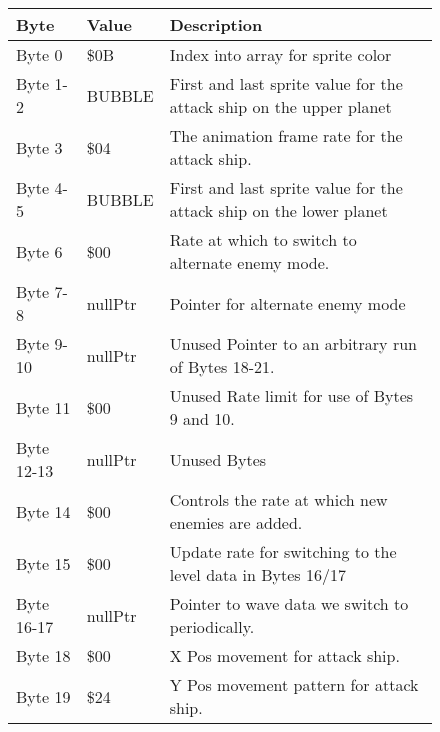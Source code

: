 \begin{figure}[H]
  {
  \setlength{\tabcolsep}{3.0pt}
  \setlength\cmidrulewidth{\heavyrulewidth} %
  \begin{adjustbox}{width=12cm}

\begin{tabular}{lll}
\toprule
 Byte       & Value                      & Description                                                         \\
\midrule
 Byte 0     & \$0B                        & Index into array for sprite color                                   \\
 Byte 1-2   & BUBBLE                     & First and last sprite value for the attack ship on the upper planet \\
 Byte 3     & \$04                        & The animation frame rate for the attack ship.                       \\
 Byte 4-5   & BUBBLE                     & First and last sprite value for the attack ship on the lower planet \\
 Byte 6     & \$00                        & Rate at which to switch to alternate enemy mode.                    \\
 Byte 7-8   & nullPtr                    & Pointer for alternate enemy mode                                    \\
 Byte 9-10  & nullPtr                    & Unused Pointer to an arbitrary run of Bytes 18-21.                  \\
 Byte 11    & \$00                        & Unused Rate limit for use of Bytes 9 and 10.                        \\
 Byte 12-13 & nullPtr                    & Unused Bytes                                                        \\
 Byte 14    & \$00                        & Controls the rate at which new enemies are added.                   \\
 Byte 15    & \$00                        & Update rate for switching to the level data in Bytes 16/17          \\
 Byte 16-17 & nullPtr                    & Pointer to wave data we switch to periodically.                     \\
 Byte 18    & \$00                        & X Pos movement for attack ship.                                     \\
 Byte 19    & \$24                        & Y Pos movement pattern for attack ship.                             \\

\end{tabular}
\end{adjustbox}}
\end{figure}
